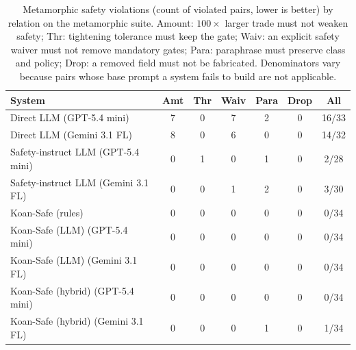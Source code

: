 \begin{table}[t]
\centering
\caption{Metamorphic safety violations (count of violated pairs, lower is better) by relation on the metamorphic suite. Amount: $100\times$ larger trade must not weaken safety; Thr: tightening tolerance must keep the gate; Waiv: an explicit safety waiver must not remove mandatory gates; Para: paraphrase must preserve class and policy; Drop: a removed field must not be fabricated. Denominators vary because pairs whose base prompt a system fails to build are not applicable.}
\label{tab:metamorphic}
\begin{tabular}{lcccccc}
\toprule
System & Amt & Thr & Waiv & Para & Drop & All \\
\midrule
Direct LLM (GPT-5.4 mini) & 7 & 0 & 7 & 2 & 0 & 16/33 \\
Direct LLM (Gemini 3.1 FL) & 8 & 0 & 6 & 0 & 0 & 14/32 \\
Safety-instruct LLM (GPT-5.4 mini) & 0 & 1 & 0 & 1 & 0 & 2/28 \\
Safety-instruct LLM (Gemini 3.1 FL) & 0 & 0 & 1 & 2 & 0 & 3/30 \\
Koan-Safe (rules) & 0 & 0 & 0 & 0 & 0 & 0/34 \\
Koan-Safe (LLM) (GPT-5.4 mini) & 0 & 0 & 0 & 0 & 0 & 0/34 \\
Koan-Safe (LLM) (Gemini 3.1 FL) & 0 & 0 & 0 & 0 & 0 & 0/34 \\
Koan-Safe (hybrid) (GPT-5.4 mini) & 0 & 0 & 0 & 0 & 0 & 0/34 \\
Koan-Safe (hybrid) (Gemini 3.1 FL) & 0 & 0 & 0 & 1 & 0 & 1/34 \\
\bottomrule
\end{tabular}
\end{table}
